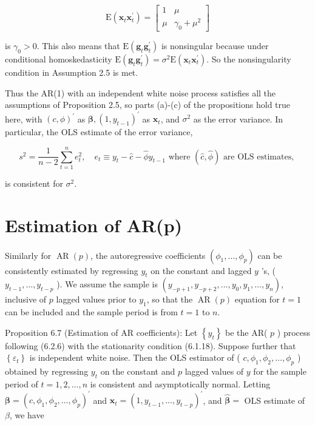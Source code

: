 \documentclass[10pt]{article}
\begin{document}
\[
\mathrm{E}\left(\mathbf{x}_{t} \mathbf{x}_{t}^{\prime}\right)=\left[\begin{array}{cc}
1 & \mu  \tag{6.4.4}\\
\mu & \gamma_{0}+\mu^{2}
\end{array}\right]
\]

is $\gamma_{0}>0$. This also means that $\mathrm{E}\left(\mathbf{g}_{t} \mathbf{g}_{t}^{\prime}\right)$ is nonsingular because under conditional homoskedasticity $\mathrm{E}\left(\mathbf{g}_{t} \mathbf{g}_{t}^{\prime}\right)=\sigma^{2} \mathrm{E}\left(\mathbf{x}_{t} \mathbf{x}_{t}^{\prime}\right)$. So the nonsingularity condition in Assumption 2.5 is met.

Thus the AR(1) with an independent white noise process satisfies all the assumptions of Proposition 2.5, so parts (a)-(c) of the propositions hold true here, with $(c, \phi)^{\prime}$ as $\boldsymbol{\beta},\left(1, y_{t-1}\right)^{\prime}$ as $\mathbf{x}_{t}$, and $\sigma^{2}$ as the error variance. In particular, the OLS estimate of the error variance,

$$
s^{2}=\frac{1}{n-2} \sum_{t=1}^{n} e_{t}^{2}, \quad e_{t} \equiv y_{t}-\hat{c}-\hat{\phi} y_{t-1} \text { where }(\hat{c}, \hat{\phi}) \text { are OLS estimates, }
$$

is consistent for $\sigma^{2}$.

\section*{Estimation of AR(p)}
Similarly for $\operatorname{AR}(p)$, the autoregressive coefficients $\left(\phi_{1}, \ldots, \phi_{p}\right)$ can be consistently estimated by regressing $y_{t}$ on the constant and lagged $y$ 's, ( $y_{t-1}, \ldots, y_{t-p}$ ). We assume the sample is $\left(y_{-p+1}, y_{-p+2}, \ldots, y_{0}, y_{1}, \ldots, y_{n}\right)$, inclusive of $p$ lagged values prior to $y_{1}$, so that the $\operatorname{AR}(p)$ equation for $t=1$ can be included and the sample period is from $t=1$ to $n$.

Proposition 6.7 (Estimation of AR coefficients): Let $\left\{y_{t}\right\}$ be the AR( $p$ ) process following (6.2.6) with the stationarity condition (6.1.18). Suppose further that $\left\{\varepsilon_{t}\right\}$ is independent white noise. Then the OLS estimator of ( $c, \phi_{1}, \phi_{2}, \ldots, \phi_{p}$ )\\
obtained by regressing $y_{t}$ on the constant and $p$ lagged values of $y$ for the sample period of $t=1,2, \ldots, n$ is consistent and asymptotically normal. Letting $\boldsymbol{\beta}=\left(c, \phi_{1}, \phi_{2}, \ldots, \phi_{p}\right)^{\prime}$ and $\mathbf{x}_{t}=\left(1, y_{t-1}, \ldots, y_{t-p}\right)^{\prime}$, and $\widehat{\boldsymbol{\beta}}=$ OLS estimate of $\beta$, we have
\end{document}
